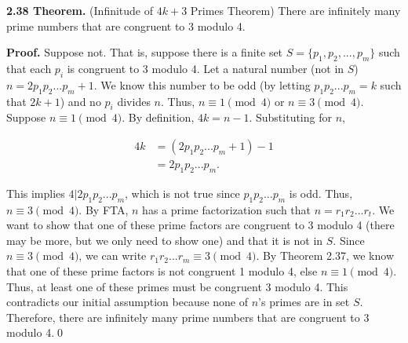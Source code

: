 \documentclass[12pt]{article}
\begin{document}
\noindent\textbf{2.38 Theorem.} (Infinitude of $4k+3$ Primes Theorem) There are infinitely many prime numbers that are congruent to 3 modulo 4.

\bigskip

\noindent\textbf{Proof.} Suppose not. That is, suppose there is a finite set $S=\{p_1,p_2,...,p_m\}$ such that each $p_i$ is congruent to 3 modulo 4. Let a natural number (not in $S$) $n=2p_1p_2...p_m+1$. We know this number to be odd (by letting $p_1p_2...p_m=k$ such that $2k+1$) and no $p_i$ divides $n$. Thus, $n\equiv 1\pmod 4$ or $n\equiv 3\pmod 4$. Suppose $n\equiv 1\pmod 4$. By definition, $4k=n-1$. Substituting for $n$,

\begin{align*}
4k &= (2p_1p_2...p_m+1)-1 \\
&= 2p_1p_2...p_m.
\end{align*}

\noindent This implies $4|2p_1p_2...p_m$, which is not true since $p_1p_2...p_m$ is odd. Thus, $n\equiv 3\pmod 4$. By FTA, $n$ has a prime factorization such that $n=r_1r_2...r_t$. We want to show that one of these prime factors are congruent to 3 modulo 4 (there may be more, but we only need to show one) and that it is not in $S$. Since $n\equiv 3\pmod 4$, we can write $r_1r_2...r_m\equiv 3\pmod 4$. By Theorem 2.37, we know that one of these prime factors is not congruent 1 modulo 4, else $n\equiv 1\pmod 4$. Thus, at least one of these primes must be congruent 3 modulo 4. This contradicts our initial assumption because none of $n$'s primes are in set $S$. Therefore, there are infinitely many prime numbers that are congruent to 3 modulo 4.\qed
\end{document}
